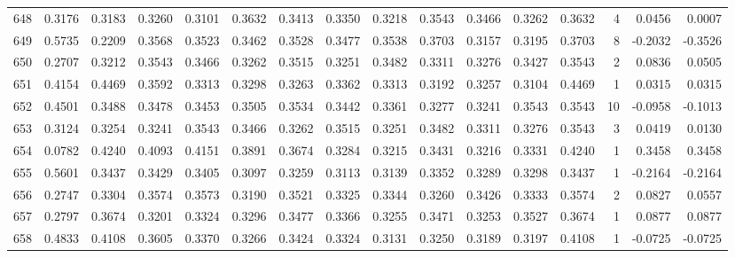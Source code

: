 \begin{tabular}{lrrrrrrrrrrrrrrr}
648 &      0.3176 &  0.3183 &  0.3260 &  0.3101 &  0.3632 &  0.3413 &  0.3350 &  0.3218 &  0.3543 &  0.3466 &   0.3262 &     0.3632 &      4 &                    0.0456 &                     0.0007 \\
649 &      0.5735 &  0.2209 &  0.3568 &  0.3523 &  0.3462 &  0.3528 &  0.3477 &  0.3538 &  0.3703 &  0.3157 &   0.3195 &     0.3703 &      8 &                   -0.2032 &                    -0.3526 \\
650 &      0.2707 &  0.3212 &  0.3543 &  0.3466 &  0.3262 &  0.3515 &  0.3251 &  0.3482 &  0.3311 &  0.3276 &   0.3427 &     0.3543 &      2 &                    0.0836 &                     0.0505 \\
651 &      0.4154 &  0.4469 &  0.3592 &  0.3313 &  0.3298 &  0.3263 &  0.3362 &  0.3313 &  0.3192 &  0.3257 &   0.3104 &     0.4469 &      1 &                    0.0315 &                     0.0315 \\
652 &      0.4501 &  0.3488 &  0.3478 &  0.3453 &  0.3505 &  0.3534 &  0.3442 &  0.3361 &  0.3277 &  0.3241 &   0.3543 &     0.3543 &     10 &                   -0.0958 &                    -0.1013 \\
653 &      0.3124 &  0.3254 &  0.3241 &  0.3543 &  0.3466 &  0.3262 &  0.3515 &  0.3251 &  0.3482 &  0.3311 &   0.3276 &     0.3543 &      3 &                    0.0419 &                     0.0130 \\
654 &      0.0782 &  0.4240 &  0.4093 &  0.4151 &  0.3891 &  0.3674 &  0.3284 &  0.3215 &  0.3431 &  0.3216 &   0.3331 &     0.4240 &      1 &                    0.3458 &                     0.3458 \\
655 &      0.5601 &  0.3437 &  0.3429 &  0.3405 &  0.3097 &  0.3259 &  0.3113 &  0.3139 &  0.3352 &  0.3289 &   0.3298 &     0.3437 &      1 &                   -0.2164 &                    -0.2164 \\
656 &      0.2747 &  0.3304 &  0.3574 &  0.3573 &  0.3190 &  0.3521 &  0.3325 &  0.3344 &  0.3260 &  0.3426 &   0.3333 &     0.3574 &      2 &                    0.0827 &                     0.0557 \\
657 &      0.2797 &  0.3674 &  0.3201 &  0.3324 &  0.3296 &  0.3477 &  0.3366 &  0.3255 &  0.3471 &  0.3253 &   0.3527 &     0.3674 &      1 &                    0.0877 &                     0.0877 \\
658 &      0.4833 &  0.4108 &  0.3605 &  0.3370 &  0.3266 &  0.3424 &  0.3324 &  0.3131 &  0.3250 &  0.3189 &   0.3197 &     0.4108 &      1 &                   -0.0725 &                    -0.0725 \\

\end{tabular}

